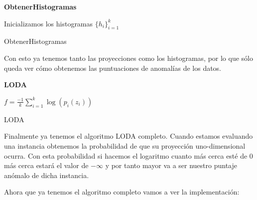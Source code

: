 \begin{algorithm}[H]{\textbf{ObtenerHistogramas}}
	
	
	Inicializamos los histogramas $\{h_i\}_{i=1}^{k}$
	
	
	
	\caption{ObtenerHistogramas}
	\label{obtener_histogramas}
\end{algorithm}

Con esto ya tenemos tanto las proyecciones como los histogramas, por lo que sólo queda ver cómo obtenemos las puntuaciones de anomalías de los datos.

\begin{algorithm}[H]{\textbf{LODA}}
	
	

	$f = \frac{-1}{k} \sum_{i=1}^{k}\log (p_i (z_i))$
	
	
	\caption{LODA}
	\label{loda}
\end{algorithm}

Finalmente ya tenemos el algoritmo LODA completo. Cuando estamos evaluando una instancia obtenemos la probabilidad de que su proyección uno-dimensional ocurra. Con esta probabilidad si hacemos el logaritmo cuanto más cerca esté de $0$ más cerca estará el valor de $-\infty$ y por tanto mayor va a ser nuestro puntaje anómalo de dicha instancia.

Ahora que ya tenemos el algoritmo completo vamos a ver la implementación:

